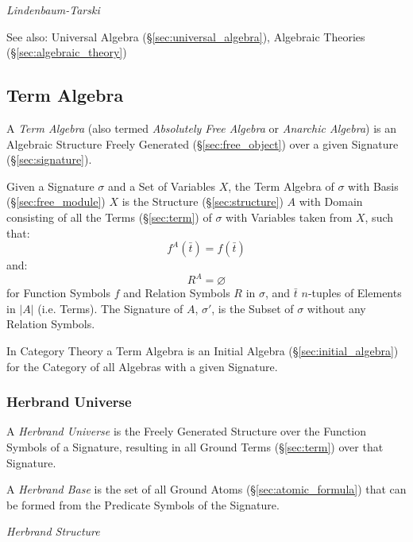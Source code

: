 \emph{Lindenbaum-Tarski}

\fist See also: Universal Algebra (\S\ref{sec:universal_algebra}), Algebraic
Theories (\S\ref{sec:algebraic_theory})



\subsection{Term Algebra}\label{sec:term_algebra}

A \emph{Term Algebra} (also termed \emph{Absolutely Free Algebra} or
\emph{Anarchic Algebra}) is an Algebraic Structure Freely Generated
(\S\ref{sec:free_object}) over a given Signature
(\S\ref{sec:signature}).

Given a Signature $\sigma$ and a Set of Variables $X$, the Term
Algebra of $\sigma$ with Basis (\S\ref{sec:free_module}) $X$ is the
Structure (\S\ref{sec:structure}) $A$ with Domain consisting of all
the Terms (\S\ref{sec:term}) of $\sigma$ with Variables taken from
$X$, such that:
\[
  f^A(\bar{t}) = f(\bar{t})
\] and: \[
  R^A = \varnothing
\]
for Function Symbols $f$ and Relation Symbols $R$ in $\sigma$, and
$\bar{t}$ $n$-tuples of Elements in $|A|$ (i.e. Terms). The Signature
of $A$, $\sigma'$, is the Subset of $\sigma$ without any Relation
Symbols.

In Category Theory a Term Algebra is an Initial Algebra
(\S\ref{sec:initial_algebra}) for the Category of all Algebras with a
given Signature.



\subsubsection{Herbrand Universe}\label{sec:herbrand_universe}

A \emph{Herbrand Universe} is the Freely Generated Structure over the
Function Symbols of a Signature, resulting in all Ground Terms
(\S\ref{sec:term}) over that Signature.

A \emph{Herbrand Base} is the set of all Ground Atoms
(\S\ref{sec:atomic_formula}) that can be formed from the Predicate
Symbols of the Signature.

\emph{Herbrand Structure}



